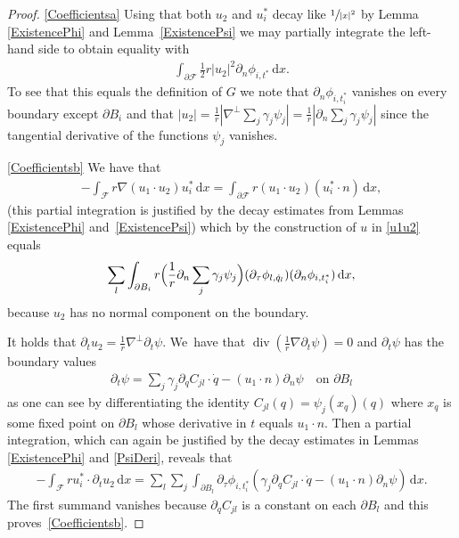 \documentclass[JEP,XML,SOM,Unicode,published]{cedram}
\theoremstyle{definition}
\renewcommand{\div}{\operatorname{div}}
\newcommand\eq{=}
\newcommand\dd{\,\mathrm{d}}
\newcommand\dx{\dd x}
\let\de\partial
\begin{document}
\skpt
\begin{proof}

\eqref{Coefficientsa}
Using that both $u_2$ and $u_i^*$ decay like $\sfrac{1}{|x|^2}$ by Lemma \ref{ExistencePhi} and Lemma~\ref{ExistencePsi} we may partially integrate the left-hand side to obtain equality with
\begin{align}
\int_{\de \mathcal{F}}\frac{1}{2}r|u_2|^2\de_n \phi_{i,t^*}\dx.
\end{align}
To see that this equals the definition of $G$ we note that $\de_n \phi_{i,t_i^*}$ vanishes on every boundary except $\de B_i$ and that $|u_2|=\frac{1}{r}|\nabla^\perp\sum_j \gamma_j\psi_j|=\frac{1}{r}|\de_n \sum_j \gamma_j\psi_j|$ since the tangential derivative of the functions $\psi_j$ vanishes.

\eqref{Coefficientsb}
We have that
\begin{align*}
-\int_\mathcal{F} r\nabla(u_1\cdot u_2)u_i^*\dx\eq\int_{\de \mathcal{F}}r(u_1\cdot u_2)(u_i^*\cdot n)\dx,
\end{align*}
(this partial integration is justified by the decay estimates from Lemmas \ref{ExistencePhi} and~\ref{ExistencePsi}) which by the construction of $u$ in \eqref{u1u2} equals
\begin{align*}
\sum_{l}\int_{\de B_i}r\Bigl(\frac{1}{r}\de_n\sum_j\gamma_j\psi_j\Bigr)(\de_\tau \phi_{l,\dot{q}_l})(\de_n \phi_{i,t_i^*})\dx,
\end{align*}
because $u_2$ has no normal component on the boundary.

It holds that $\de_tu_2=\frac{1}{r}\nabla^\perp\de_t\psi$. We~have that $\div(\frac{1}{r}\nabla\de_t\psi)=0$ and $\de_t\psi$ has the boundary values
\begin{align*}
\de_t\psi\eq\sum_j\gamma_j\de_{q} C_{jl}\cdot\dot{q}-(u_1\cdot n)\de_n\psi\quad\text{on $\de B_l$}
\end{align*}
as one can see by differentiating the identity $C_{jl}(q)=\psi_j(x_q)(q)$ where $x_q$ is some fixed point on $\de B_l$ whose derivative in $t$ equals $u_1\cdot n$.
Then a partial integration, which can again be justified by the decay estimates in Lemmas \ref{ExistencePhi} and \ref{PsiDeri}, reveals that
\begin{align*}
-\int_{\mathcal{F}}ru_i^*\cdot\de_tu_2\dx\eq\sum_l\sum_j\int_{\de B_l} \de_\tau\phi_{i,t_i^*}\left(\gamma_j\de_{q} C_{jl}\cdot\dot{q}-(u_1\cdot n)\de_n\psi\right)\dx.
\end{align*}
The first summand vanishes because $\de_q C_{jl}$ is a constant on each $\de B_l$ and this proves~\eqref{Coefficientsb}.


\end{proof}
\end{document}
